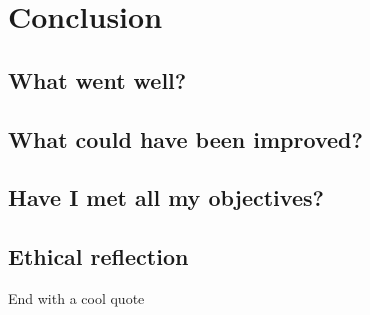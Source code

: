 \chapter{Conclusion}

\section{What went well?}

\section{What could have been improved?}

\section{Have I met all my objectives?}

\section{Ethical reflection}

End with a cool quote
